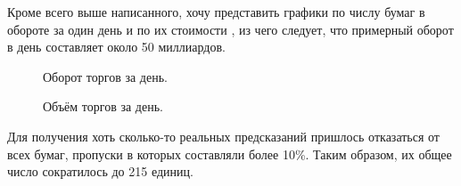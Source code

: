 \documentclass[12pt, a4paper]{article}
\begin{document}
Кроме всего выше написанного, хочу представить графики по числу бумаг в обороте за один день  и по их стоимости , из чего следует, что примерный оборот в день составляет около 50 миллиардов.
\begin{figure}[H]
\caption{Оборот торгов за день.}
\label{fig:volume_count}
\end{figure}
\begin{figure}[H]
\caption{Объём торгов за день.}
\label{fig:value_count}
\end{figure}

Для получения хоть сколько-то реальных предсказаний пришлось отказаться от всех бумаг, пропуски в которых составляли более 10\%. Таким образом, их общее число сократилось до 215 единиц.
\end{document}
